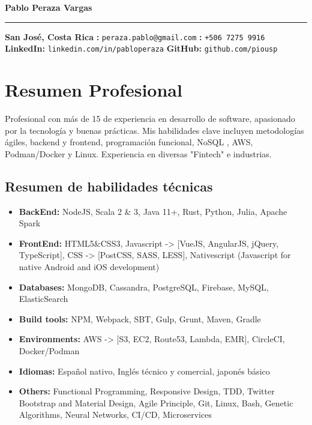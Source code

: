 \documentclass[a4paper,10pt]{article}
\begin{document}
\begin{center}
    {\Large \textbf{Pablo Peraza Vargas}}
    \par\noindent\rule{\textwidth}{1pt}
    \vspace{5pt}
    \textbf{San José, Costa Rica} \quad
    \textbf{\correo:} \texttt{peraza.pablo@gmail.com} \quad
    \textbf{\tel:} \texttt{+506 7275 9916} \\
    \textbf{LinkedIn:} \texttt{linkedin.com/in/pabloperaza} \quad
    \textbf{GitHub:} \texttt{github.com/piousp}
\end{center}

\section*{Resumen Profesional}
Profesional con más de 15 de experiencia en desarrollo de software, 
apasionado por la tecnología y buenas prácticas. Mis habilidades clave 
incluyen metodologías ágiles, backend y frontend, programación funcional, NoSQL , 
AWS, Podman/Docker y Linux. Experiencia en diversas "Fintech" e industrias.

\subsection*{Resumen de habilidades técnicas}
\begin{itemize}
    \item \textbf{BackEnd:} NodeJS, Scala 2 \& 3, Java 11+, Rust, Python, Julia, Apache Spark
    \item \textbf{FrontEnd:} HTML5\&CSS3, Javascript -> [VueJS, AngularJS, jQuery, TypeScript],
     CSS -> [PostCSS, SASS, LESS], Nativescript (Javascript for native Android and iOS development)
    \item \textbf{Databases:} MongoDB, Cassandra, PostgreSQL, Firebase, MySQL, ElasticSearch
    \item \textbf{Build tools:} NPM, Webpack, SBT, Gulp, Grunt, Maven, Gradle
    \item \textbf{Environments:} AWS -> [S3, EC2, Route53, Lambda, EMR], CircleCI, Docker/Podman
    \item \textbf{Idiomas:} Español nativo, Inglés técnico y comercial, japonés básico
    \item \textbf{Others:} Functional Programming, Responsive Design, TDD, 
    Twitter Bootstrap and Material Design, Agile Principle, Git, 
    Linux, Bash, Genetic Algorithms, Neural Networks, CI/CD, Microservices
\end{itemize}
\end{document}
